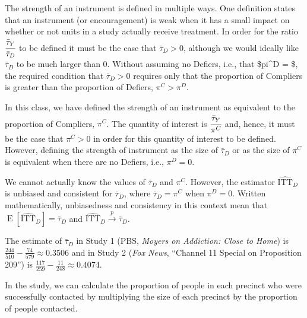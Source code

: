 \documentclass[
  12pt,
  leqno]{article}
\newenvironment{Shaded}{\begin{snugshade}}{\end{snugshade}}
\newcommand{\KeywordTok}[1]{\textcolor[rgb]{0.13,0.29,0.53}{\textbf{#1}}}
\newcommand{\NormalTok}[1]{#1}
\newcommand{\OperatorTok}[1]{\textcolor[rgb]{0.81,0.36,0.00}{\textbf{#1}}}
\newcommand{\StringTok}[1]{\textcolor[rgb]{0.31,0.60,0.02}{#1}}
\DeclareMathOperator{\E}{\mathrm{E}}
\DeclareMathOperator{\1}{\mathbbm{1}}
\begin{document}
The strength of an instrument is defined in multiple ways. One
definition states that an instrument (or encouragement) is weak when it
has a small impact on whether or not units in a study actually receive
treatment. In order for the ratio \(\cfrac{\bar{\tau}_Y}{\bar{\tau}_D}\)
to be defined it must be the case that \(\bar{\tau}_D > 0\), although we
would ideally like \(\bar{\tau}_D\) to be much larger than \(0\).
Without assuming no Defiers, i.e., that \$pi\^{}D = \$, the required
condition that \(\bar{\tau}_D > 0\) requires only that the proportion of
Compliers is greater than the proportion of Defiers, \(\pi^C > \pi^D\).

In this class, we have defined the strength of an instrument as
equivalent to the proportion of Compliers, \(\pi^C\). The quantity of
interest is \(\cfrac{\bar{\tau}_Y}{\pi^C}\) and, hence, it must be the
case that \(\pi^C > 0\) in order for this quantity of interest to be
defined. However, defining the strength of instrument as the size of
\(\bar{\tau}_D\) or as the size of \(\pi^C\) is equivalent when there
are no Defiers, i.e., \(\pi^D = 0\).

We cannot actually know the values of \(\bar{\tau}_D\) and \(\pi^C\).
However, the estimator \(\widehat{\text{ITT}}_D\) is unbiased and
consistent for \(\bar{\tau}_D\), where \(\bar{\tau}_D = \pi^C\) when
\(\pi^D = 0\). Written mathematically, unbiasedness and consistency in
this context mean that
\(\E\left[\widehat{\text{ITT}}_D\right] = \bar{\tau}_D\) and
\(\widehat{\text{ITT}}_D \overset{p}{\to} \bar{\tau}_D\).

The estimate of \(\bar{\tau}_D\) in Study 1 (PBS,
\textit{Moyers on Addiction: Close to Home}) is
\(\frac{244}{510} - \frac{74}{579} \approx 0.3506\) and in Study 2
(\textit{Fox News}, ``Channel 11 Special on Proposition 209'') is
\(\frac{117}{259} - \frac{11}{248} \approx 0.4074\).

In the \citet{arceneaux2005} study, we can calculate the proportion of
people in each precinct who were successfully contacted by multiplying
the size of each precinct by the proportion of people contacted.

\scriptsize

\begin{Shaded}
\end{Shaded}
\end{document}
